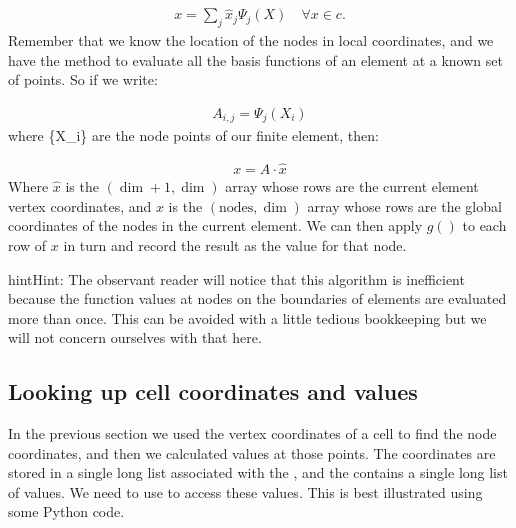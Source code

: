 \documentclass{book}
\begin{document}
\label{\detokenize{5_functions:equation-change}}\begin{equation}\label{equation:5_functions:change}
\begin{split}x = \sum_j \hat{x}_j \Psi_j(X) \quad \forall x \in c.\end{split}
\end{equation}
Remember that we know the location of the nodes in local coordinates,
and we have the
 method to
evaluate all the basis functions of an element at a known set of
points. So if we write:

\label{\detokenize{5_functions:equation-foo0}}\begin{equation}\label{equation:5_functions:foo0}
\begin{split}A_{i,j} = \Psi_j(X_i)\end{split}
\end{equation}
where \{X\_i\} are the node points of our finite element, then:

\label{\detokenize{5_functions:equation-foo1}}\begin{equation}\label{equation:5_functions:foo1}
\begin{split}x = A\cdot \hat{x}\end{split}
\end{equation}
Where \(\hat{x}\) is the \((\dim+1, \dim)\) array whose rows are the current
element vertex coordinates, and \(x\) is the \((\textrm{nodes}, \dim)\) array whose
rows are the global coordinates of the nodes in the current
element. We can then apply \(g()\) to each row of \(x\) in turn and record
the result as the  value
for that node.

\begin{sphinxadmonition}{hint}{Hint:}
The observant reader will notice that this algorithm is inefficient
because the function values at nodes on the boundaries of elements
are evaluated more than once. This can be avoided with a little
tedious bookkeeping but we will not concern ourselves with that
here.
\end{sphinxadmonition}


\subsection{Looking up cell coordinates and values}
\label{\detokenize{5_functions:looking-up-cell-coordinates-and-values}}
In the previous section we used the vertex coordinates of a cell to
find the node coordinates, and then we calculated
 values at those
points. The coordinates are stored in a single long list associated
with the , and the
 contains a single long
list of values. We need to use  to access these
values. This is best illustrated using some Python code.
\end{document}
